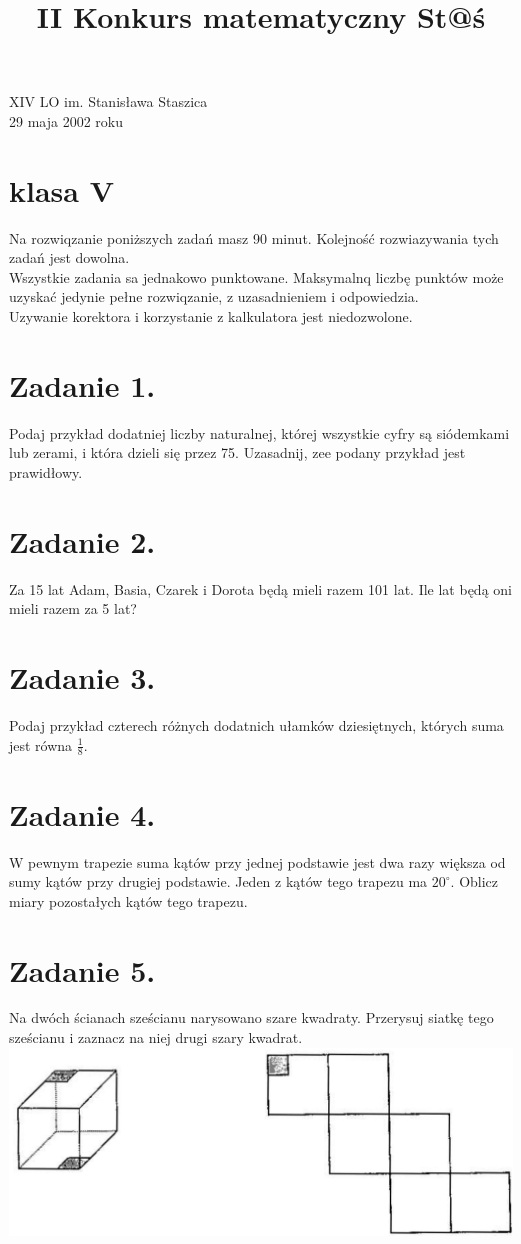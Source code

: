 \documentclass[10pt]{article}
\title{II Konkurs matematyczny St@ś }
\author{}
\date{}
\begin{document}
\maketitle
XIV LO im. Stanisława Staszica\\
29 maja 2002 roku

\section*{klasa V}
Na rozwiqzanie poniższych zadań masz 90 minut. Kolejność rozwiazywania tych zadań jest dowolna.\\
Wszystkie zadania sa jednakowo punktowane. Maksymalnq liczbę punktów może uzyskać jedynie pełne rozwiqzanie, z uzasadnieniem i odpowiedzia.\\
Uzywanie korektora i korzystanie z kalkulatora jest niedozwolone.

\section*{Zadanie 1.}
Podaj przykład dodatniej liczby naturalnej, której wszystkie cyfry są siódemkami lub zerami, i która dzieli się przez 75. Uzasadnij, zee podany przykład jest prawidłowy.

\section*{Zadanie 2.}
Za 15 lat Adam, Basia, Czarek i Dorota będą mieli razem 101 lat. Ile lat będą oni mieli razem za 5 lat?

\section*{Zadanie 3.}
Podaj przykład czterech różnych dodatnich ułamków dziesiętnych, których suma jest równa \(\frac{1}{8}\).

\section*{Zadanie 4.}
W pewnym trapezie suma kątów przy jednej podstawie jest dwa razy większa od sumy kątów przy drugiej podstawie. Jeden z kątów tego trapezu ma \(20^{\circ}\). Oblicz miary pozostałych kątów tego trapezu.

\section*{Zadanie 5.}
Na dwóch ścianach sześcianu narysowano szare kwadraty. Przerysuj siatkę tego sześcianu i zaznacz na niej drugi szary kwadrat.\\
\includegraphics[max width=\textwidth, center]{2024_11_21_6040501f3d8f918315ffg-1}
\end{document}
